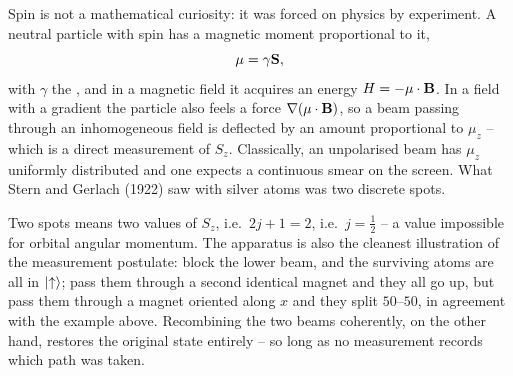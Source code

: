 \documentclass[a4paper]{scrartcl}
\begin{document}
Spin is not a mathematical curiosity: it was forced on physics by experiment. A neutral particle with spin has a magnetic moment proportional to it,
$$
\mathbf{\mu} = \gamma \mathbf{S},
$$
with $\gamma$ the , and in a magnetic field it acquires an energy $H = -\mathbf{\mu}\cdot\mathbf{B}$. In a field with a gradient the particle also feels a force $\nabla(\mathbf{\mu}\cdot\mathbf{B})$, so a beam passing through an inhomogeneous field is deflected by an amount proportional to $\mu_z$ -- which is a direct measurement of $S_z$. Classically, an unpolarised beam has $\mu_z$ uniformly distributed and one expects a continuous smear on the screen. What Stern and Gerlach (1922) saw with silver atoms was two discrete spots.

\begin{center}
\end{center}

Two spots means two values of $S_z$, i.e.\ $2j+1 = 2$, i.e.\ $j = \frac12$ -- a value impossible for orbital angular momentum. The apparatus is also the cleanest illustration of the measurement postulate: block the lower beam, and the surviving atoms are all in $\ket\uparrow$; pass them through a second identical magnet and they all go up, but pass them through a magnet oriented along $x$ and they split $50$--$50$, in agreement with the example above. Recombining the two beams coherently, on the other hand, restores the original state entirely -- so long as no measurement records which path was taken.
\end{document}
